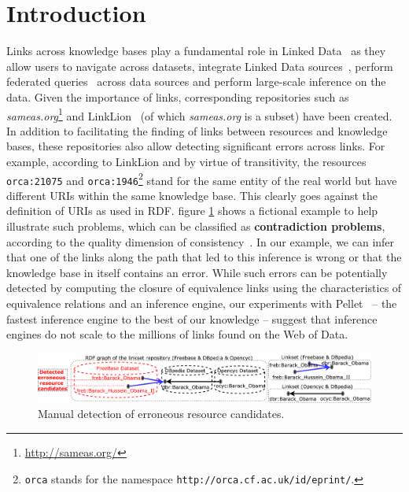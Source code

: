 \section{Introduction}
Links across knowledge bases play a fundamental role in Linked Data~\cite{Albertoni:2013:ALQ:2457317.2457327} as they  allow users to navigate across datasets, integrate Linked Data sources~\cite{NgomoSL14}, perform federated queries~\cite{saleem2013daw} across data sources and perform large-scale inference on the data.
Given the importance of links, corresponding repositories such as \emph{sameas.org}\footnote{\url{http://sameas.org/}} and LinkLion~\cite{nentwig2014linklion} (of which \emph{sameas.org} is a subset) have been created. 
In addition to facilitating the finding of links between  resources and knowledge bases, these repositories also allow detecting significant errors across links. 
For example, according to LinkLion and by virtue of transitivity, the resources \texttt{orca:21075} and \texttt{orca:1946}\footnote{\texttt{orca} stands for the namespace \texttt{http://orca.cf.ac.uk/id/eprint/}.} stand for the same entity of the real world but have different URIs within the same knowledge base. 
This clearly goes against the definition of URIs as used in RDF. 
figure \ref{fig:example} shows a fictional example to help illustrate such problems, which can be classified as \textbf{contradiction problems}, according to the quality dimension of consistency~\cite{zaveri2015quality}. 
In our example, we can infer that one of the links along the path that led to this inference is wrong or that the knowledge base in itself contains an error. 
While such errors can be potentially detected by computing the closure of equivalence links using the characteristics of equivalence relations and an inference engine, our experiments with Pellet~\cite{bockbenchmarking} -- the fastest inference engine to the best of our knowledge -- suggest that inference engines do not scale to the millions of links found on the Web of Data. 

\begin{figure}[htb] 
	\centering
	\includegraphics[width=1.0\linewidth]{img/example8.pdf}
	\caption{Manual detection of erroneous resource candidates.}
	\label{fig:example}
\end{figure} 

